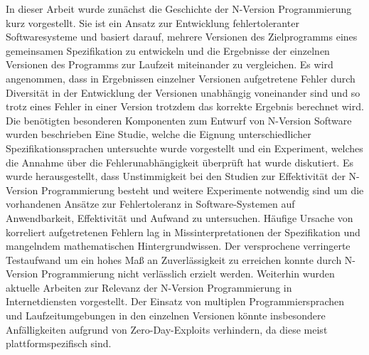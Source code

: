 %
In dieser Arbeit wurde zunächst die Geschichte der N-Version Programmierung kurz vorgestellt.
Sie ist ein Ansatz zur Entwicklung fehlertoleranter Softwaresysteme und basiert darauf, mehrere Versionen des Zielprogramms eines gemeinsamen Spezifikation zu entwickeln und die Ergebnisse der einzelnen Versionen des Programms zur Laufzeit miteinander zu vergleichen.
Es wird angenommen, dass in Ergebnissen einzelner Versionen aufgetretene Fehler durch Diversität in der Entwicklung der Versionen unabhängig voneinander sind und so trotz eines Fehler in einer Version trotzdem das korrekte Ergebnis berechnet wird.
Die benötigten besonderen Komponenten zum Entwurf von N-Version Software wurden beschrieben
Eine Studie, welche die Eignung unterschiedlicher Spezifikationssprachen untersuchte wurde vorgestellt und ein Experiment, welches die Annahme über die Fehlerunabhängigkeit überprüft hat wurde diskutiert. Es wurde herausgestellt, dass Unstimmigkeit bei den Studien zur Effektivität der N-Version Programmierung besteht und weitere Experimente notwendig sind um die vorhandenen Ansätze zur Fehlertoleranz in Software-Systemen auf Anwendbarkeit, Effektivität und Aufwand zu untersuchen.
Häufige Ursache von korreliert aufgetretenen Fehlern lag in Missinterpretationen der Spezifikation und mangelndem mathematischen Hintergrundwissen. Der versprochene verringerte Testaufwand um ein hohes Maß an Zuverlässigkeit zu erreichen konnte durch N-Version Programmierung nicht verlässlich erzielt werden.
Weiterhin wurden aktuelle Arbeiten zur Relevanz der N-Version Programmierung in Internetdiensten vorgestellt. Der Einsatz von multiplen Programmiersprachen und Laufzeitumgebungen in den einzelnen Versionen könnte insbesondere Anfälligkeiten aufgrund von Zero-Day-Exploits verhindern, da diese meist plattformspezifisch sind.



